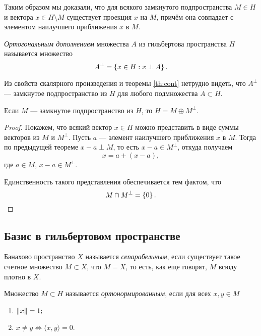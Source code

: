 Таким образом мы доказали, что для всякого замкнутого подпространства $M \in H$
и вектора $x \in H\setminus M$ существует проекция $x$ на $M$, причём она совпадает с
элементом наилучшего приближения $x$ в $M$.

\begin{definition}
    \emph{Ортогональным дополнением} множества $A$ из гильбертова пространства $H$ называется множество
    \[ A^\perp = \left\{x \in H : x \perp A\right\}. \]
\end{definition}

Из свойств скалярного произведения и теоремы \ref{th:cont} нетрудно видеть, 
что $A^\perp$ --- замкнутое подпространство из $H$ для любого
подмножества $A \subset H$.

\begin{theorem}
    Если $M$ --- замкнутое подпространство из $H$, то $H = M \oplus M^\perp$.
\end{theorem}

\begin{proof}
    Покажем, что всякий вектор $x \in H$ можно представить в виде суммы векторов
    из $M$ и $M^\perp$. Пусть $a$ --- элемент наилучшего приближения $x$ в $M$.
    Тогда по предыдущей теореме $x - a \perp M$, то есть $x - a \in M^\perp$,
    откуда получаем
    \[ x = a + (x - a), \]
    где $a \in M$, $x - a \in M^\perp$.

    Единственность такого представления обеспечивается тем фактом, что
    \[ M \cap M^\perp = \left\{0\right\}. \]
\end{proof}

\subsection{Базис в гильбертовом пространстве}

\begin{definition}
    Банахово пространство $X$ называется \emph{сепарабельным}, если существует такое
    счетное множество $M \subset X$, что $\overline{M} = X$, то есть, как еще говорят, $M$
    всюду плотно в $X$.
\end{definition}

\begin{definition}
    Множество $M \subset H$ называется \emph{ортонормированным}, если для всех $x, y \in M$
    \begin{enumerate}
        \item $ \left\|x\right\| = 1; $
        \item $ x \neq y \Leftrightarrow \langle x, y \rangle = 0. $
    \end{enumerate}
\end{definition}

